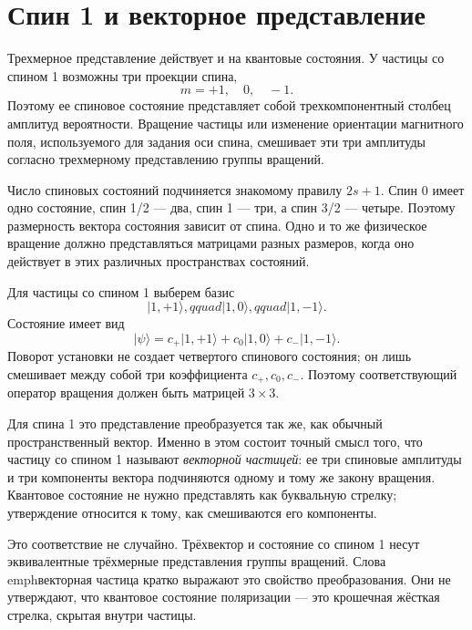 \section{Спин 1 и векторное представление}

Трехмерное представление действует и на квантовые состояния. У частицы со спином 1 возможны три проекции спина,
\begin{equation}
m=+1,\quad 0,\quad -1.
\end{equation}
Поэтому ее спиновое состояние представляет собой трехкомпонентный столбец амплитуд вероятности. Вращение частицы или изменение ориентации магнитного поля, используемого для задания оси спина, смешивает эти три амплитуды согласно трехмерному представлению группы вращений.

Число спиновых состояний подчиняется знакомому правилу \(2s+1\). Спин 0 имеет одно состояние, спин 1/2 — два, спин 1 — три, а спин 3/2 — четыре. Поэтому размерность вектора состояния зависит от спина. Одно и то же физическое вращение должно представляться матрицами разных размеров, когда оно действует в этих различных пространствах состояний.

Для частицы со спином 1 выберем базис
\begin{equation}
\lvert 1,+1\rangle,qquad
\lvert 1,0\rangle,qquad
\lvert 1,-1\rangle.
\end{equation}
Состояние имеет вид
\begin{equation}
\lvert\psi\rangle
=c_{+}\lvert1,+1\rangle+c_0\lvert1,0\rangle+c_{-}\lvert1,-1\rangle.
\end{equation}
Поворот установки не создает четвертого спинового состояния; он лишь смешивает между собой три коэффициента \(c_+,c_0,c_-\). Поэтому соответствующий оператор вращения должен быть матрицей \(3\times3\).

Для спина 1 это представление преобразуется так же, как обычный пространственный вектор. Именно в этом состоит точный смысл того, что частицу со спином 1 называют \emph{векторной частицей}: ее три спиновые амплитуды и три компоненты вектора подчиняются одному и тому же закону вращения. Квантовое состояние не нужно представлять как буквальную стрелку; утверждение относится к тому, как смешиваются его компоненты.

Это соответствие не случайно. Трёхвектор и состояние со спином 1 несут эквивалентные трёхмерные представления группы вращений. Слова emph{векторная частица} кратко выражают это свойство преобразования. Они не утверждают, что квантовое состояние поляризации — это крошечная жёсткая стрелка, скрытая внутри частицы.

